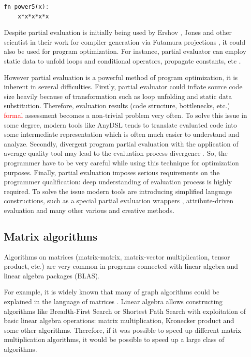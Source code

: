 \documentclass[conference]{IEEEtran}
\begin{document}
\begin{lstlisting}[caption={Power function partially evaluation using n = 5},label={lst:power5}]
fn power5(x):
	x*x*x*x*x
\end{lstlisting}


Despite partial evaluation is initially being used by Ershov \cite{ershov1982mixed}, Jones \cite{jones1993partial} and other scientist in their work for compiler generation via Futamura projections \cite{futamura1983partial}, it could also be used for program optimization. For instance, partial evaluator can employ static data to unfold loops and conditional operators, propagate constants, etc \cite{jones1993partial}. 

However partial evaluation is a powerful method of program optimization, it is inherent in several difficulties. Firstly, partial evaluator could inflate source code size heavily because of transformation such as loop unfolding and static data substitution. Therefore, evaluation results (code structure, bottlenecks, etc.) \textcolor{red}{formal} assessment becomes a non-trivial problem very often. To solve this issue in some degree, modern tools like AnyDSL \cite{leissa2018anydsl} tends to translate evaluated code into some intermediate representation which is often much easier to understand and analyze. Secondly, divergent program partial evaluation with the application of average-quality tool may lead to the evaluation process divergence \cite{jones1993partial}. So, the programmer have to be very careful while using this technique for optimization purposes. Finally, partial evaluation imposes serious requirements on the programmer qualification: deep understanding of evaluation process is highly required. To solve the issue modern tools are introducing simplified language constructions, such as a special partial evaluation wrappers \cite{leissa2018anydsl}, attribute-driven evaluation \cite{10.1007/978-3-319-74313-4_27} and many other various and creative methods.

\subsection{Matrix algorithms}

Algorithms on matrices (matrix-matrix, matrix-vector multiplication, tensor product, etc.) are very common in programs connected with linear algebra and linear algebra packages (BLAS).

For example, it is widely known that many of graph algorithms could be explained in the language of matrices \cite{kepner2011graph,davis2019algorithm}. Linear algebra allows constructing algorithms like Breadth-First Search or Shortest Path Search with exploitation of basic linear algebra operations: matrix multiplication, Kronecker product and some other algorithms. Therefore, if it was possible to speed up different matrix multiplication algorithms, it would be possible to speed up a large class of algorithms. 
\end{document}

